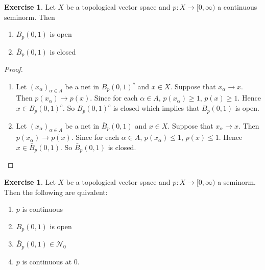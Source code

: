 \documentclass[12pt]{amsart}
\theoremstyle{definition}
\newtheorem{ex}[definition]{Exercise}
\newcommand{\al}{\alpha}
\newcommand{\MN}{\mathcal{N}}
\newcommand{\Rg}{[0,\infty)}
\begin{document}
	\begin{ex}
		Let $X$ be a topological vector space and $p:X \rightarrow \Rg$ a continuous seminorm. Then 
		\begin{enumerate}
			\item $B_p(0,1)$ is open 
			\item $\bar{B}_p(0,1)$ is closed
		\end{enumerate}
	\end{ex}

	\begin{proof}\
		\begin{enumerate}
			\item Let $(x_{\al})_{\al \in A}$ be a net in $B_p(0,1)^c$ and $x \in X$. Suppose that $x_{\al} \rightarrow x$. Then $p(x_{\al}) \rightarrow p(x)$. Since for each $\al \in A$, $p(x_{\al}) \geq 1$, $p(x) \geq 1$. Hence $x \in B_p(0,1)^c$. So $B_p(0,1)^c$ is closed which implies that $B_p(0,1)$ is open.
			\item Let $(x_{\al})_{\al \in A}$ be a net in $\bar{B}_p(0,1)$ and $x \in X$. Suppose that $x_{\al} \rightarrow x$. Then $p(x_{\al}) \rightarrow p(x)$. Since for each $\al \in A$, $p(x_{\al}) \leq 1$, $p(x) \leq 1$. Hence $x \in \bar{B}_p(0,1)$. So $\bar{B}_p(0,1)$ is closed.
		\end{enumerate}
	\end{proof}

	\begin{ex}
		Let $X$ be a topological vector space and $p:X \rightarrow \Rg$ a seminorm. Then the following are quivalent:
		\begin{enumerate}
			\item $p$ is continuous
			\item $B_p(0,1)$ is open
			\item $\bar{B}_p(0,1) \in \MN_0$ 
			\item $p$ is continuous at $0$. 
		\end{enumerate}
	\end{ex}
\end{document}
